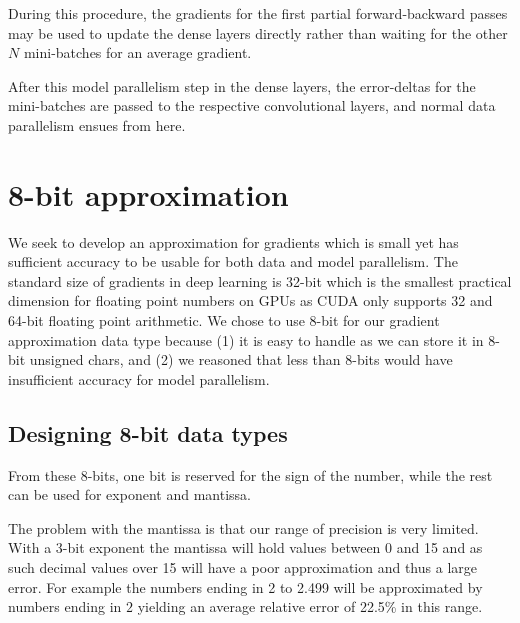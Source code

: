 \documentclass{article} %
\begin{document}
During this procedure, the gradients for the first partial forward-backward passes may be used to update the dense layers directly rather than waiting for the other $N$ mini-batches for an average gradient. 

After this model parallelism step in the dense layers, the error-deltas for the mini-batches are passed to the respective convolutional layers, and normal data parallelism ensues from here.

\section{8-bit approximation}

We seek to develop an approximation for gradients which is small yet has sufficient accuracy to be usable for both data and model parallelism. The standard size of gradients in deep learning is 32-bit which is the smallest practical dimension for floating point numbers on GPUs as CUDA only supports 32 and 64-bit floating point arithmetic. We chose to use 8-bit for our gradient approximation data type because (1) it is easy to handle as we can store it in 8-bit unsigned chars, and (2) we reasoned that less than 8-bits would have insufficient accuracy for model parallelism. 

\subsection{Designing 8-bit data types}

From these 8-bits, one bit is reserved for the sign of the number, while the rest can be used for exponent and mantissa. 

The problem with the mantissa is that our range of precision is very limited. With a 3-bit exponent the mantissa will hold values between 0 and 15 and as such decimal values over 15 will have a poor approximation and thus a large error. For example the numbers ending in 2 to 2.499 will be approximated by numbers ending in $2$ yielding an average relative error of 22.5\% in this range.
\end{document}
